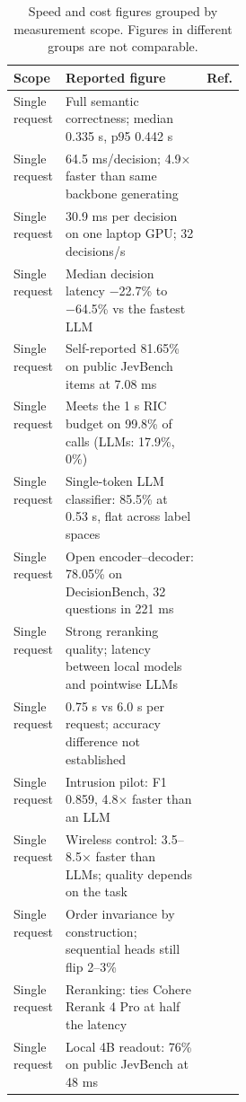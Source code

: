\begin{table}[tbp]
\centering\footnotesize
\caption{Speed and cost figures grouped by measurement scope. Figures in different groups are not comparable.}\label{tab:scopes}
\begin{tabularx}{\linewidth}{p{0.2\linewidth}Xp{0.1\linewidth}}
\toprule
\textbf{Scope} & \textbf{Reported figure} & \textbf{Ref.} \\
\midrule
Single request & Full semantic correctness; median 0.335 s, p95 0.442 s & \citep{arxiv2609_24965} \\
Single request & 64.5 ms/\allowbreak{}decision; 4.9× faster than same backbone generating & \citep{arxiv2609_23959} \\
Single request & 30.9 ms per decision on one laptop GPU; 32 decisions/\allowbreak{}s & \citep{arxiv2609_23886} \\
Single request & Median decision latency −22.7\% to −64.5\% vs the fastest LLM & \citep{arxiv2609_22753} \\
Single request & Self-reported 81.65\% on public JevBench items at 7.08 ms & \citep{arxiv2609_25498} \\
Single request & Meets the 1 s RIC budget on 99.8\% of calls (LLMs: 17.9\%, 0\%) & \citep{arxiv2609_23136} \\
Single request & Single-token LLM classifier: 85.5\% at 0.53 s, flat across label spaces & \citep{arxiv2609_36115} \\
Single request & Open encoder–decoder: 78.05\% on DecisionBench, 32 questions in 221 ms & \citep{arxiv2609_39111} \\
Single request & Strong reranking quality; latency between local models and pointwise LLMs & \citep{arxiv2609_40241} \\
Single request & 0.75 s vs 6.0 s per request; accuracy difference not established & \citep{arxiv2610_00376} \\
Single request & Intrusion pilot: F1 0.859, 4.8× faster than an LLM & \citep{arxiv2610_01079} \\
Single request & Wireless control: 3.5–8.5× faster than LLMs; quality depends on the task & \citep{arxiv2610_04345} \\
Single request & Order invariance by construction; sequential heads still flip 2–3\% & \citep{arxiv2610_06744} \\
Single request & Reranking: ties Cohere Rerank 4 Pro at half the latency &  \\
Single request & Local 4B readout: 76\% on public JevBench at 48 ms &  \\

\end{tabularx}
\end{table}
